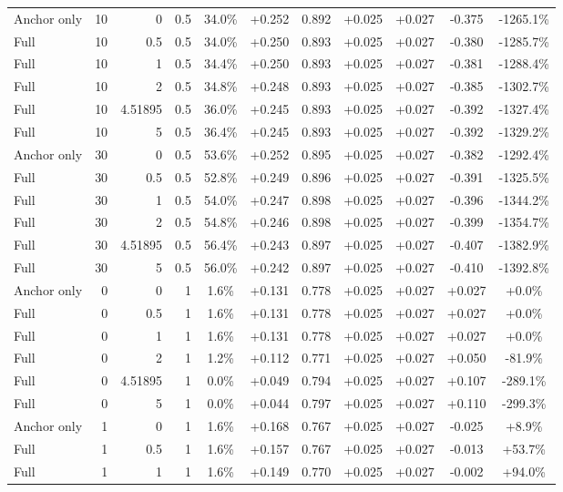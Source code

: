 \begin{table}[htbp]
\begin{tabular}{lrrrccccccc}
Anchor only & 10 & 0 & 0.5 & 34.0\% & +0.252 & 0.892 & +0.025 & +0.027 & -0.375 & -1265.1\% \\
Full & 10 & 0.5 & 0.5 & 34.0\% & +0.250 & 0.893 & +0.025 & +0.027 & -0.380 & -1285.7\% \\
Full & 10 & 1 & 0.5 & 34.4\% & +0.250 & 0.893 & +0.025 & +0.027 & -0.381 & -1288.4\% \\
Full & 10 & 2 & 0.5 & 34.8\% & +0.248 & 0.893 & +0.025 & +0.027 & -0.385 & -1302.7\% \\
Full & 10 & 4.51895 & 0.5 & 36.0\% & +0.245 & 0.893 & +0.025 & +0.027 & -0.392 & -1327.4\% \\
Full & 10 & 5 & 0.5 & 36.4\% & +0.245 & 0.893 & +0.025 & +0.027 & -0.392 & -1329.2\% \\
Anchor only & 30 & 0 & 0.5 & 53.6\% & +0.252 & 0.895 & +0.025 & +0.027 & -0.382 & -1292.4\% \\
Full & 30 & 0.5 & 0.5 & 52.8\% & +0.249 & 0.896 & +0.025 & +0.027 & -0.391 & -1325.5\% \\
Full & 30 & 1 & 0.5 & 54.0\% & +0.247 & 0.898 & +0.025 & +0.027 & -0.396 & -1344.2\% \\
Full & 30 & 2 & 0.5 & 54.8\% & +0.246 & 0.898 & +0.025 & +0.027 & -0.399 & -1354.7\% \\
Full & 30 & 4.51895 & 0.5 & 56.4\% & +0.243 & 0.897 & +0.025 & +0.027 & -0.407 & -1382.9\% \\
Full & 30 & 5 & 0.5 & 56.0\% & +0.242 & 0.897 & +0.025 & +0.027 & -0.410 & -1392.8\% \\
Anchor only & 0 & 0 & 1 & 1.6\% & +0.131 & 0.778 & +0.025 & +0.027 & +0.027 & +0.0\% \\
Full & 0 & 0.5 & 1 & 1.6\% & +0.131 & 0.778 & +0.025 & +0.027 & +0.027 & +0.0\% \\
Full & 0 & 1 & 1 & 1.6\% & +0.131 & 0.778 & +0.025 & +0.027 & +0.027 & +0.0\% \\
Full & 0 & 2 & 1 & 1.2\% & +0.112 & 0.771 & +0.025 & +0.027 & +0.050 & -81.9\% \\
Full & 0 & 4.51895 & 1 & 0.0\% & +0.049 & 0.794 & +0.025 & +0.027 & +0.107 & -289.1\% \\
Full & 0 & 5 & 1 & 0.0\% & +0.044 & 0.797 & +0.025 & +0.027 & +0.110 & -299.3\% \\
Anchor only & 1 & 0 & 1 & 1.6\% & +0.168 & 0.767 & +0.025 & +0.027 & -0.025 & +8.9\% \\
Full & 1 & 0.5 & 1 & 1.6\% & +0.157 & 0.767 & +0.025 & +0.027 & -0.013 & +53.7\% \\
Full & 1 & 1 & 1 & 1.6\% & +0.149 & 0.770 & +0.025 & +0.027 & -0.002 & +94.0\% \\

\end{tabular}
\end{table}
